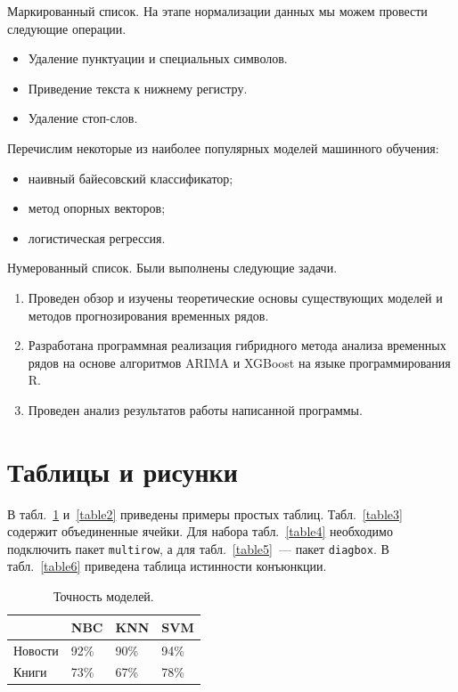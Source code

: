 \documentclass{stud-conf-pmk}
\begin{document}
\begin{paper}
Маркированный список. На этапе нормализации данных мы можем провести
следующие операции.
\begin{itemize}
\item Удаление пунктуации и специальных символов.
\item Приведение текста к нижнему регистру.
\item Удаление стоп-слов.
\end{itemize}
Перечислим некоторые из наиболее популярных моделей машинного обучения:
\begin{itemize}
\item наивный байесовский классификатор;
\item метод опорных векторов;
\item логистическая регрессия.
\end{itemize}

Нумерованный список. Были выполнены следующие задачи.
\begin{enumerate}
\item Проведен обзор и изучены теоретические основы существующих моделей и
методов прогнозирования временных рядов.
\item Разработана программная реализация гибридного метода анализа
временных рядов на основе алгоритмов ARIMA и XGBoost на языке
программирования R.
\item Проведен анализ результатов работы написанной программы.
\end{enumerate}


\section{Таблицы и рисунки}

В табл.~\ref{table1} и~\ref{table2} приведены примеры простых таблиц.
Табл.~\ref{table3} содержит объединенные ячейки. Для набора
табл.~\ref{table4} необходимо подключить пакет \verb|multirow|, а для
табл.~\ref{table5}~--- пакет \verb|diagbox|. В табл.~\ref{table6}
приведена таблица истинности конъюнкции.

\begin{table}
\centering
\caption{Точность моделей.}
\begin{tabular}{|l|l|l|l|}
\hline
& NBC & KNN & SVM\\
\hline
Новости & 92\% & 90\% & 94\%\\
\hline
Книги & 73\% & 67\% & 78\%\\
\hline
\end{tabular}
\label{table1}
\end{table}


\end{paper}
\end{document}
